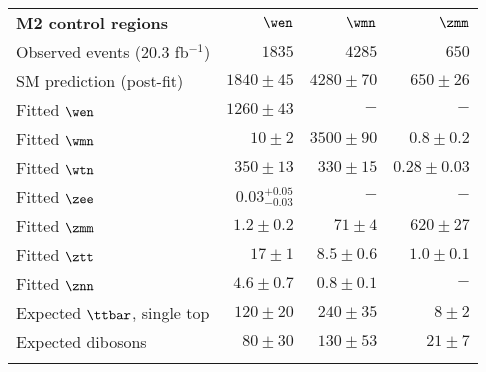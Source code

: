 \begin{table}[!ht]
\begin{center}
\setlength{\tabcolsep}{0.0pc}
{\footnotesize
    \begin{tabular*}{\textwidth}{@{\extracolsep{\fill}}lrrr}
  \noalign{\smallskip}\hline\noalign{\smallskip}
  {\bf  M2 control regions}           & $\wen$            & $\wmn$            & $\zmm$              \\[-0.05cm]
  \noalign{\smallskip}\hline\noalign{\smallskip}
    Observed events  (20.3 fb${}^{-1}$)        & $1835$              & $4285$              & $650$                    \\
    \noalign{\smallskip}\hline\noalign{\smallskip}
    SM prediction (post-fit)         & $1840 \pm 45$          & $4280 \pm 70$          & $650 \pm 26$              \\
    \noalign{\smallskip}\hline\noalign{\smallskip}
    Fitted $\wen$          & $1260 \pm 43$          & $-$          & $-$              \\
    Fitted $\wmn$          & $10 \pm 2$          & $3500 \pm 90$          & $0.8 \pm 0.2$              \\
    Fitted $\wtn$          & $350 \pm 13$          & $330 \pm 15$          & $0.28 \pm 0.03$              \\
    Fitted $\zee$          & $0.03_{-0.03}^{+0.05}$          & $-$          & $-$              \\
    Fitted $\zmm$         & $1.2 \pm 0.2$          & $71 \pm 4$          & $620 \pm 27$              \\
    Fitted $\ztt$         & $17 \pm 1$          & $8.5 \pm 0.6$          & $1.0 \pm 0.1$              \\
    Fitted $\znn$         & $4.6 \pm 0.7$          & $0.8 \pm 0.1$          & $-$              \\
    Expected $\ttbar$, single top      & $120 \pm 20$          & $240 \pm 35$          & $8 \pm 2$              \\
    Expected dibosons         & $80 \pm 30$          & $130 \pm 53$          & $21 \pm 7$              \\
    \noalign{\smallskip}\hline\noalign{\smallskip}

\end{tabular*}}
\end{center}
\end{table}
